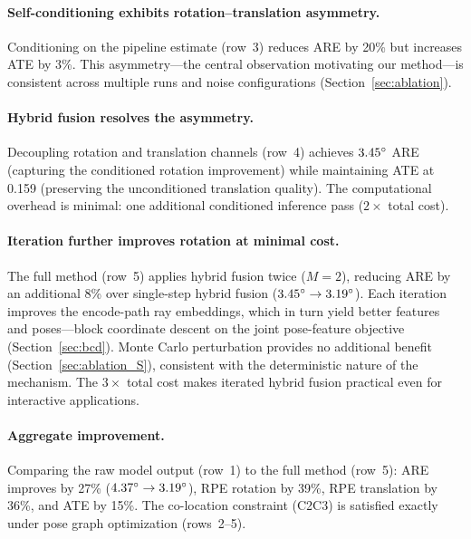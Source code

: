 \paragraph{Self-conditioning exhibits rotation--translation asymmetry.} Conditioning on the pipeline estimate (row~3) reduces ARE by 20\% but increases ATE by 3\%. This asymmetry---the central observation motivating our method---is consistent across multiple runs and noise configurations (Section~\ref{sec:ablation}).

\paragraph{Hybrid fusion resolves the asymmetry.} Decoupling rotation and translation channels (row~4) achieves $3.45\degree{}$ ARE (capturing the conditioned rotation improvement) while maintaining ATE at 0.159 (preserving the unconditioned translation quality). The computational overhead is minimal: one additional conditioned inference pass ($2\times$ total cost).

\paragraph{Iteration further improves rotation at minimal cost.} The full method (row~5) applies hybrid fusion twice ($M=2$), reducing ARE by an additional 8\% over single-step hybrid fusion ($3.45\degree \rightarrow 3.19\degree$). Each iteration improves the encode-path ray embeddings, which in turn yield better features and poses---block coordinate descent on the joint pose-feature objective (Section~\ref{sec:bcd}). Monte Carlo perturbation provides no additional benefit (Section~\ref{sec:ablation_S}), consistent with the deterministic nature of the mechanism. The $3\times$ total cost makes iterated hybrid fusion practical even for interactive applications.

\paragraph{Aggregate improvement.} Comparing the raw model output (row~1) to the full method (row~5): ARE improves by 27\% ($4.37\degree \rightarrow 3.19\degree$), RPE rotation by 39\%, RPE translation by 36\%, and ATE by 15\%. The co-location constraint (C2C3) is satisfied exactly under pose graph optimization (rows~2--5).

